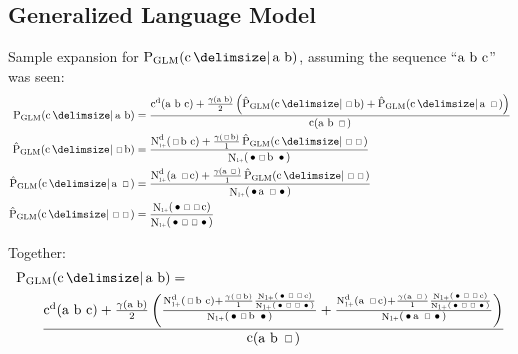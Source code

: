 \documentclass[m,bachelor,binding]{WeSTthesis}
\newcommand*{\Scale}[2][4]{\scalebox{#1}{$#2$}}%
\DeclareMathOperator{\Count}{c}
\DeclareMathOperator{\ContCount}{N}
\newcommand{\ContCountIp}  {\ContCount_{\Scale[0.5]{1+}}}
\newcommand{\Skp}{\ensuremath{\,\Scale[0.7]{\square}\,}}
\newcommand{\WSkp}{\ensuremath{\,\bullet\,}}
\begin{document}
{\begin{appendices}
\clearpage
\section{Generalized Language Model}

\newcommand{\ProbGLMcab}[2]
  {\frac{\DiscountedCount(\text{a b c}) + \frac{\gamma(\text{a b})}{2}\left(#1 + #2\right)}{\Count(\text{a b \Skp})}}
\newcommand{\ProbGLMcsb}[1]
  {\frac{\DiscountedCount*(\text{\Skp b c}) + \frac{\gamma(\text{\Skp b})}{1} #1}{\ContCountIp(\text{\WSkp \Skp b \WSkp})}}
\newcommand{\ProbGLMcas}[1]
  {\frac{\DiscountedCount*(\text{a \Skp c}) + \frac{\gamma(\text{a \Skp})}{1} #1}{\ContCountIp(\text{\WSkp a \Skp \WSkp})}}
\newcommand{\ProbGLMcss}
  {\frac{\ContCountIp(\text{\WSkp \Skp \Skp c})}{\ContCountIp(\text{\WSkp \Skp \Skp \WSkp})}}

Sample expansion for $\ProbGLM{\text{c}}{\text{a b}}$, assuming the sequence
``$\text{\text{a b c}}$'' was seen:
\begin{align}
  \ProbGLM {\text{c}}{\text{a b}}       &= \ProbGLMcab{\ProbGLM*{\text{c}}{\text{\Skp b}}}{\ProbGLM*{\text{c}}{\text{a \Skp}}} \\
  \ProbGLM*{\text{c}}{\text{\Skp b}}    &= \ProbGLMcsb{\ProbGLM*{\text{c}}{\text{\Skp \Skp}}} \\
  \ProbGLM*{\text{c}}{\text{a \Skp}}    &= \ProbGLMcas{\ProbGLM*{\text{c}}{\text{\Skp \Skp}}} \\
  \ProbGLM*{\text{c}}{\text{\Skp \Skp}} &= \ProbGLMcss
\end{align}

Together:
\begin{align}
  &\ProbGLM{\text{c}}{\text{a b}} =\\
  &\qquad \ProbGLMcab{\ProbGLMcsb{\ProbGLMcss}}
                     {\ProbGLMcas{\ProbGLMcss}} \nonumber
\end{align}


\end{appendices}}
\end{document}
